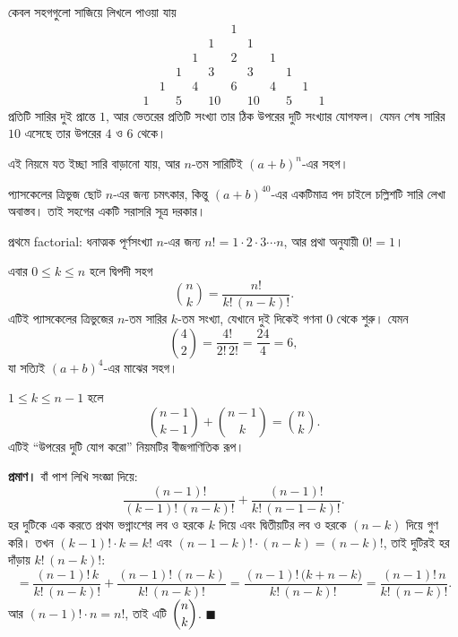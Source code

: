 \documentclass[11pt]{article}
\begin{document}
\begin{idea}[প্যাসকেলের ত্রিভুজ]
কেবল সহগগুলো সাজিয়ে লিখলে পাওয়া যায়
\[
\begin{array}{ccccccccccc}
  & & & & & 1 & & & & & \\[2pt]
  & & & & 1 & & 1 & & & & \\[2pt]
  & & & 1 & & 2 & & 1 & & & \\[2pt]
  & & 1 & & 3 & & 3 & & 1 & & \\[2pt]
  & 1 & & 4 & & 6 & & 4 & & 1 & \\[2pt]
  1 & & 5 & & 10 & & 10 & & 5 & & 1
\end{array}
\]
প্রতিটি সারির দুই প্রান্তে $1$, আর ভেতরের প্রতিটি সংখ্যা তার ঠিক উপরের দুটি
সংখ্যার যোগফল। যেমন শেষ সারির $10$ এসেছে তার উপরের $4$ ও $6$ থেকে।

এই নিয়মে যত ইচ্ছা সারি বাড়ানো যায়, আর $n$-তম সারিটিই $(a+b)^{n}$-এর সহগ।
\end{idea}

\begin{idea}[দ্বিপদী সহগ]
প্যাসকেলের ত্রিভুজ ছোট $n$-এর জন্য চমৎকার, কিন্তু $(a+b)^{40}$-এর একটিমাত্র
পদ চাইলে চল্লিশটি সারি লেখা অবাস্তব। তাই সহগের একটি সরাসরি সূত্র দরকার।

প্রথমে factorial: ধনাত্মক পূর্ণসংখ্যা $n$-এর জন্য
$n! = 1 \cdot 2 \cdot 3 \cdots n$, আর প্রথা অনুযায়ী $0! = 1$।

এবার $0 \leq k \leq n$ হলে দ্বিপদী সহগ
\[
  \binom{n}{k} = \frac{n!}{k!\,(n-k)!} .
\]
এটিই প্যাসকেলের ত্রিভুজের $n$-তম সারির $k$-তম সংখ্যা, যেখানে দুই দিকেই গণনা $0$
থেকে শুরু। যেমন
\[
  \binom{4}{2} = \frac{4!}{2!\,2!} = \frac{24}{4} = 6 ,
\]
যা সত্যিই $(a+b)^{4}$-এর মাঝের সহগ।
\end{idea}

\begin{idea}[প্যাসকেলের নিয়ম]
$1 \leq k \leq n-1$ হলে
\[
  \binom{n-1}{k-1} + \binom{n-1}{k} = \binom{n}{k} .
\]
এটিই ``উপরের দুটি যোগ করো'' নিয়মটির বীজগাণিতিক রূপ।
\end{idea}

\noindent
\textbf{প্রমাণ।} বাঁ পাশ লিখি সংজ্ঞা দিয়ে:
\[
  \frac{(n-1)!}{(k-1)!\,(n-k)!} + \frac{(n-1)!}{k!\,(n-1-k)!} .
\]
হর দুটিকে এক করতে প্রথম ভগ্নাংশের লব ও হরকে $k$ দিয়ে এবং দ্বিতীয়টির লব ও হরকে
$(n-k)$ দিয়ে গুণ করি। তখন $(k-1)! \cdot k = k!$ এবং
$(n-1-k)! \cdot (n-k) = (n-k)!$, তাই দুটিরই হর দাঁড়ায় $k!\,(n-k)!$:
\[
  = \frac{(n-1)!\,k}{k!\,(n-k)!} + \frac{(n-1)!\,(n-k)}{k!\,(n-k)!}
  = \frac{(n-1)!\,\big( k + n - k \big)}{k!\,(n-k)!}
  = \frac{(n-1)!\,n}{k!\,(n-k)!} .
\]
আর $(n-1)! \cdot n = n!$, তাই এটি $\dbinom{n}{k}$. $\blacksquare$
\end{document}

